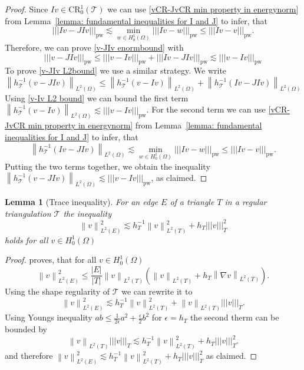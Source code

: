 \documentclass[11pt,a4paper]{article}
\newcommand{\Ltwo}[2]{\left\lVert #1 \right\rVert_{L^2(#2)}}
\newcommand{\enorm}[1]{\left\lvert\!\left\lvert\!\left\lvert #1 \right\rvert\!\right\rvert\!\right\rvert}
\newcommand{\pwenorm}[1]{\left\lvert\!\left\lvert\!\left\lvert #1 \right\rvert\!\right\rvert\!\right\rvert_{\mathrm{pw}}}
\newcommand{\CR}{\mathrm{CR}^1_0(\mathcal{T})}
\newtheorem{lemma}{Lemma}
\begin{document}
\begin{proof}
 Since \(Iv \in \CR\) we can use \eqref{vCR-JvCR min property in energynorm} from Lemma~\ref{lemma: fundamental inequalities for I and J} to infer, that 
 \begin{equation*}
\pwenorm{Iv - JIv} \lesssim \min_{w \in H^1_0(\Omega)} \pwenorm{Iv - w} \le \pwenorm{Iv - v}.
 \end{equation*} Therefore, we can prove \eqref{v-JIv enormbound} with 
 \begin{equation*}
\pwenorm{v-JIv} \le \pwenorm{v-Iv} + \pwenorm{Iv-JIv} \lesssim \pwenorm{v-Iv}
 \end{equation*}
 To prove \eqref{v-JIv L2bound} we use a similar strategy. We write
 \begin{equation*}
     \Ltwo{h_\mathcal{T}^{-1} (v-JIv)}{\Omega} \le \Ltwo{h_\mathcal{T}^{-1} (v-Iv)}{\Omega} + \Ltwo{h_\mathcal{T}^{-1}(Iv - JIv)}{\Omega}
 \end{equation*}
 Using \eqref{v-Iv L2 bound} we can bound the first term \(\Ltwo{h_\mathcal{T}^{-1} (v-Iv)}{\Omega} \lesssim \pwenorm{v-Iv}\). For the second term we can use \eqref{vCR-JvCR min property in energynorm} from Lemma~\ref{lemma: fundamental inequalities for I and J} to infer, that 
 \begin{equation*}
\Ltwo{h_\mathcal{T}^{-1}(Iv - JIv)}{\Omega} \lesssim \min_{w \in H^1_0(\Omega)} \pwenorm{Iv - w} \le \pwenorm{Iv - v}.
\end{equation*}
Putting the two terms together, we obtain the inequality \(\Ltwo{h_\mathcal{T}^{-1} (v-JIv)}{\Omega} \lesssim \pwenorm{v-Iv}\), as claimed.
\end{proof}
\begin{lemma}[Trace inequality]
\label{lemma: trace inequality}
For an edge \(E\) of a triangle \(T\) in a regular triangulation \(\mathcal{T}\) the inequality
\begin{equation}\label{trace inequality}
\Ltwo{v}{E}^2 \lesssim h_T^{-1} \Ltwo{v}{T}^2 + h_T \enorm{v}_T^2
\end{equation}
holds for all \(v \in H^1_0(\Omega)\)
\end{lemma}
\begin{proof}
\cite[p.23-24]{Puttkammer2023} proves, that for all \(v \in H^1_0(\Omega)\)
\begin{equation*}
\Ltwo{v}{E}^2 \le \frac{|E|}{|T|} \Ltwo{v}{T} \left( \Ltwo{v}{T} + h_T \Ltwo{\nabla v}{T} \right).
\end{equation*}
Using the shape regularity of \(\mathcal{T}\) we can rewrite it to 
\begin{equation*}
\Ltwo{v}{E}^2 \lesssim h_T^{-1} \Ltwo{v}{T}^2 + \Ltwo{v}{T}\enorm{v}_T.
\end{equation*}
Using Youngs inequality \(ab \le \frac{1}{2\epsilon} a^2 + \frac{\epsilon}{2}b^2\) for \(\epsilon=h_T\) the second therm can be bounded by 
\begin{equation*}
    \Ltwo{v}{T} \enorm{v}_T \lesssim h_T^{-1} \Ltwo{v}{T}^2 + h_T \enorm{v}_T^2.
\end{equation*}
and therefore \(\Ltwo{v}{E}^2 \lesssim h_T^{-1} \Ltwo{v}{T}^2 + h_T \enorm{v}_T^2 \) as claimed. 
\end{proof}
\end{document}
